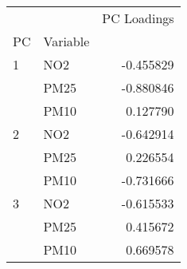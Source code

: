 \begin{tabular}{llr}
\toprule
  &      &  PC Loadings \\
PC & Variable &              \\
\midrule
1 & NO2 &    -0.455829 \\
  & PM25 &    -0.880846 \\
  & PM10 &     0.127790 \\
2 & NO2 &    -0.642914 \\
  & PM25 &     0.226554 \\
  & PM10 &    -0.731666 \\
3 & NO2 &    -0.615533 \\
  & PM25 &     0.415672 \\
  & PM10 &     0.669578 \\
\bottomrule
\end{tabular}
